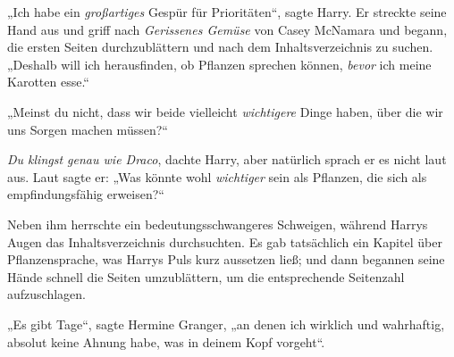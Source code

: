 „Ich habe ein \emph{großartiges} Gespür für Prioritäten“, sagte Harry. Er streckte seine Hand aus und griff nach \emph{Gerissenes Gemüse} von Casey McNamara und begann, die ersten Seiten durchzublättern und nach dem Inhaltsverzeichnis zu suchen.
„Deshalb will ich herausfinden, ob Pflanzen sprechen können, \emph{bevor} ich meine Karotten esse.“

„Meinst du nicht, dass wir beide vielleicht \emph{wichtigere} Dinge haben, über die wir uns Sorgen machen müssen?“

\emph{Du klingst genau wie Draco}, dachte Harry, aber natürlich sprach er es nicht laut aus. Laut sagte er:
„Was könnte wohl \emph{wichtiger} sein als Pflanzen, die sich als empfindungsfähig erweisen?“

Neben ihm herrschte ein bedeutungsschwangeres Schweigen, während Harrys Augen das Inhaltsverzeichnis durchsuchten. Es gab tatsächlich ein Kapitel über Pflanzensprache, was Harrys Puls kurz aussetzen ließ; und dann begannen seine Hände schnell die Seiten umzublättern, um die entsprechende Seitenzahl aufzuschlagen.

„Es gibt Tage“, sagte Hermine Granger, „an denen ich wirklich und wahrhaftig, absolut keine Ahnung habe, was in deinem Kopf vorgeht“.

